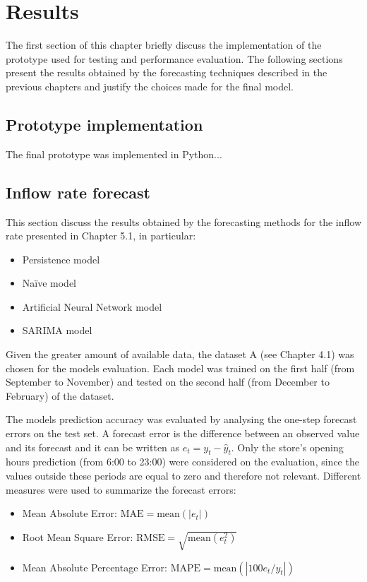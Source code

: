 \chapter{Results}
\label{cha:results}

The first section of this chapter briefly discuss the implementation of the prototype used for testing and performance evaluation. The following sections present the results obtained by the forecasting techniques described in the previous chapters and justify the choices made for the final model.

\section{Prototype implementation}
\label{sec:checkouts_optimization}
The final prototype was implemented in Python...

\section{Inflow rate forecast}
\label{sec:inflow_rate_forecast}
This section discuss the results obtained by the forecasting methods for the inflow rate presented in Chapter 5.1, in particular:
\begin{itemize}
  \item Persistence model
  \item Naïve model
  \item Artificial Neural Network model
  \item SARIMA model
\end{itemize}

Given the greater amount of available data, the dataset A (see Chapter 4.1) was chosen for the models evaluation. Each model was trained on the first half (from September to November) and tested on the second half (from December to February) of the dataset.

The models prediction accuracy was evaluated by analysing the one-step forecast errors on the test set. A forecast error is the difference between an observed value and its forecast and it can be written as $ e_t = y_t - \hat{y}_t $. Only the store’s opening hours prediction (from 6:00 to 23:00) were considered on the evaluation, since the values outside these periods are equal to zero and therefore not relevant. Different measures were used to summarize the forecast errors:
\begin{itemize}
  \item Mean Absolute Error: $ \text{MAE} = \text{mean}(| e_t |)$
  \item Root Mean Square Error: $ \text{RMSE} = \sqrt{\text{mean}(e_t^2)} $
  \item Mean Absolute Percentage Error: $ \text{MAPE} =  \text{mean}(| 100 e_t / y_t |) $
\end{itemize}

